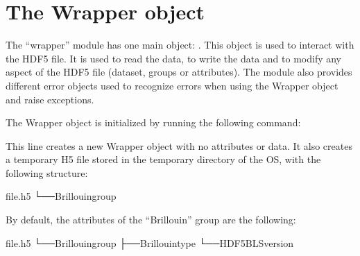 \documentclass[letterpaper,10pt,english]{sphinxmanual}
\begin{document}
\section{The Wrapper object}
\label{\detokenize{source/hdf5_bls_package:the-wrapper-object}}
\sphinxAtStartPar
The “wrapper” module has one main object: . This object is used to interact with the HDF5 file. It is used to read the data, to write the data and to modify any aspect of the HDF5 file (dataset, groups or attributes). The module also provides different error objects used to recognize errors when using the Wrapper object and raise exceptions.

\sphinxAtStartPar
The Wrapper object is initialized by running the following command:

\begin{sphinxVerbatim}[commandchars=\\\{\}]
  
\end{sphinxVerbatim}

\sphinxAtStartPar
This line creates a new Wrapper object with no attributes or data. It also creates a temporary H5 file stored in the temporary directory of the OS, with the following structure:

\begin{sphinxVerbatim}[commandchars=\\\{\}]
file.h5
└──Brillouingroup
\end{sphinxVerbatim}

\sphinxAtStartPar
By default, the attributes of the “Brillouin” group are the following:

\begin{sphinxVerbatim}[commandchars=\\\{\}]
file.h5
└──Brillouingroup
├──Brillouin\PYGZus{}type\PYGZhy{}\PYGZgt{}
└──HDF5\PYGZus{}BLS\PYGZus{}version\PYGZhy{}\PYGZgt{}
\end{sphinxVerbatim}
\end{document}
